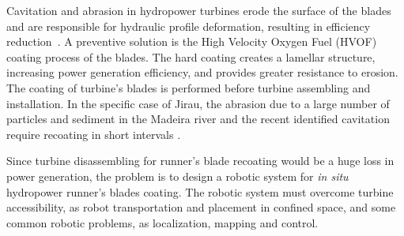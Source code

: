 Cavitation and abrasion in hydropower turbines erode the surface of the
blades and are responsible for hydraulic profile deformation, resulting in
efficiency reduction~\citep{brennen2013cavitation}. A preventive solution is
the High Velocity Oxygen Fuel (HVOF) coating process of the blades. The hard
coating creates a lamellar structure, increasing power generation efficiency,
and provides greater resistance to erosion. The coating of turbine's blades is
performed before turbine assembling and installation. In the specific
case of Jirau, the abrasion due to a large number of particles and
sediment in the Madeira river and the recent identified cavitation require
recoating in short intervals \citep{santa2009slurry}.%

Since turbine disassembling for runner's blade recoating would be a huge loss in
power generation, the problem is to design a robotic system for
\textit{in situ} hydropower runner's blades coating. The robotic system must
overcome turbine accessibility, as robot transportation and placement in
confined space, and some common robotic problems, as localization, mapping and control.



